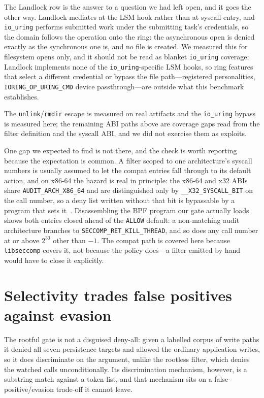 \documentclass[11pt]{article}
\begin{document}
The Landlock row is the answer to a question we had left open, and it goes the other way. Landlock
mediates at the LSM hook rather than at syscall entry, and \texttt{io\_uring} performs submitted work
under the submitting task's credentials, so the domain follows the operation onto the ring: the
asynchronous open is denied exactly as the synchronous one is, and no file is created. We measured
this for filesystem opens only, and it should not be read as blanket \texttt{io\_uring} coverage;
Landlock implements none of the \texttt{io\_uring}-specific LSM hooks, so ring features that select a
different credential or bypass the file path---registered personalities,
\texttt{IORING\_OP\_URING\_CMD} device passthrough---are outside what this benchmark establishes.

The \texttt{unlink}/\texttt{rmdir} escape is measured on real artifacts and the \texttt{io\_uring}
bypass is measured here; the remaining ABI paths above are coverage gaps read from the filter
definition and the syscall ABI, and we did not exercise them as exploits.

One gap we expected to find is not there, and the check is worth reporting because the expectation is
common. A filter scoped to one architecture's syscall numbers is usually assumed to let the compat
entries fall through to its default action, and on x86-64 the hazard is real in principle: the x86-64
and x32 ABIs share \texttt{AUDIT\_ARCH\_X86\_64} and are distinguished only by
\texttt{\_\_X32\_SYSCALL\_BIT} on the call number, so a deny list written without that bit is
bypassable by a program that sets it~\cite{seccompman}. Disassembling the BPF program our gate
actually loads shows both entries closed ahead of the \texttt{ALLOW} default: a non-matching audit
architecture branches to \texttt{SECCOMP\_RET\_KILL\_THREAD}, and so does any call number at or above
$2^{30}$ other than $-1$. The compat path is covered here because \texttt{libseccomp} covers it, not
because the policy does---a filter emitted by hand would have to close it explicitly.

\section{Selectivity trades false positives against evasion}\label{sec:selectivity}

The rootful gate is not a disguised deny-all: given a labelled corpus of write paths it denied all
seven persistence targets and allowed the ordinary application writes, so it does discriminate on the
argument, unlike the rootless filter, which denies the watched calls unconditionally. Its
discrimination mechanism, however, is a substring match against a token list, and that mechanism sits
on a false-positive/evasion trade-off it cannot leave.
\end{document}

